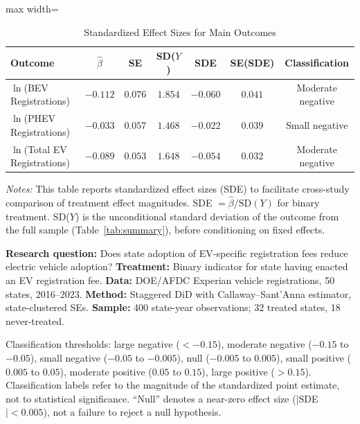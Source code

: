 \begin{table}[H]
\centering
\caption{Standardized Effect Sizes for Main Outcomes}
\label{tab:sde}
\begin{adjustbox}{max width=\textwidth}
\begin{tabular}{lcccccc}
\toprule
Outcome & $\hat{\beta}$ & SE & SD($Y$) & SDE & SE(SDE) & Classification \\
\midrule
$\ln$(BEV Registrations) & $-0.112$ & $0.076$ & $1.854$ & $-0.060$ & $0.041$ & Moderate negative \\
$\ln$(PHEV Registrations) & $-0.033$ & $0.057$ & $1.468$ & $-0.022$ & $0.039$ & Small negative \\
$\ln$(Total EV Registrations) & $-0.089$ & $0.053$ & $1.648$ & $-0.054$ & $0.032$ & Moderate negative \\
\bottomrule
\end{tabular}
\end{adjustbox}
\par\vspace{0.3em}
{\footnotesize \emph{Notes:} This table reports standardized effect sizes (SDE)
to facilitate cross-study comparison of treatment effect magnitudes.
SDE $= \hat{\beta} / \text{SD}(Y)$ for binary treatment.
SD($Y$) is the unconditional standard deviation of the outcome from the full sample
(Table~\ref{tab:summary}), before conditioning on fixed effects.

\textbf{Research question:} Does state adoption of EV-specific registration fees reduce electric vehicle adoption?
\textbf{Treatment:} Binary indicator for state having enacted an EV registration fee.
\textbf{Data:} DOE/AFDC Experian vehicle registrations, 50 states, 2016--2023.
\textbf{Method:} Staggered DiD with Callaway--Sant'Anna estimator, state-clustered SEs.
\textbf{Sample:} 400 state-year observations; 32 treated states, 18 never-treated.

Classification thresholds:
large negative ($< -0.15$), moderate negative ($-0.15$ to $-0.05$),
small negative ($-0.05$ to $-0.005$), null ($-0.005$ to $0.005$),
small positive ($0.005$ to $0.05$), moderate positive ($0.05$ to $0.15$),
large positive ($> 0.15$).
Classification labels refer to the magnitude of the standardized point estimate,
not to statistical significance. ``Null'' denotes a near-zero effect size
($|$SDE$| < 0.005$), not a failure to reject a null hypothesis.}
\end{table}

